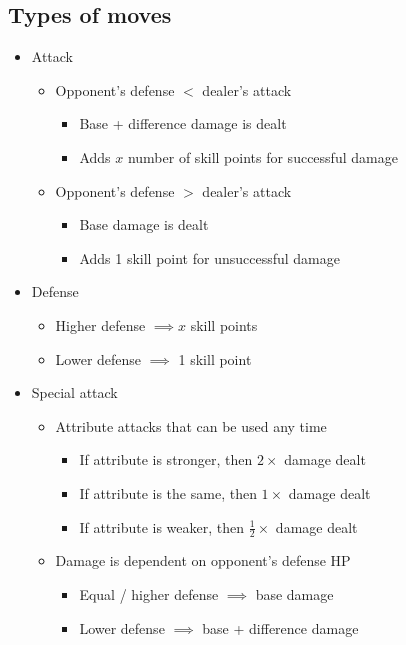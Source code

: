 \documentclass{article}
\begin{document}
  \subsection{Types of moves}
  \begin{itemize}
    \item Attack
      \begin{itemize}
        \item Opponent's defense $<$ dealer's attack
          \begin{itemize}
            \item Base + difference damage is dealt
            \item Adds $x$ number of skill points for successful damage
          \end{itemize}
        \item Opponent's defense $>$ dealer's attack
          \begin{itemize}
            \item Base damage is dealt
            \item Adds 1 skill point for unsuccessful damage
          \end{itemize}
      \end{itemize}
    \item Defense
      \begin{itemize}
        \item Higher defense $\implies x$ skill points
        \item Lower defense $\implies$ 1 skill point
      \end{itemize}
    \item Special attack
      \begin{itemize}
        \item Attribute attacks that can be used any time
          \begin{itemize}
            \item If attribute is stronger, then $2\times$ damage dealt
            \item If attribute is the same, then $1\times$ damage dealt
            \item If attribute is weaker, then $\frac{1}{2}\times$ damage dealt
          \end{itemize}
        \item Damage is dependent on opponent's defense HP
          \begin{itemize}
            \item Equal / higher defense $\implies$ base damage
            \item Lower defense $\implies$ base + difference damage
          \end{itemize}
      \end{itemize}
  \end{itemize}
  
\end{document}

